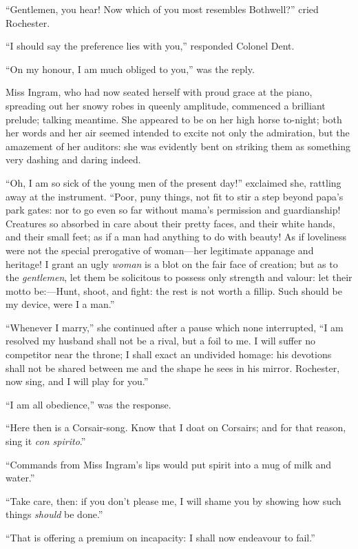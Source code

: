 \enquote{Gentlemen, you hear! Now which of you most resembles
Bothwell?} cried \Mr{} Rochester.

\enquote{I should say the preference lies with you,} responded Colonel
Dent.

\enquote{On my honour, I am much obliged to you,} was the reply.

Miss Ingram, who had now seated herself with proud grace at the piano,
spreading out her snowy robes in queenly amplitude, commenced a
brilliant prelude; talking meantime. She appeared to be on her high
horse to-night; both her words and her air seemed intended to excite not
only the admiration, but the amazement of her auditors: she was
evidently bent on striking them as something very dashing and daring
indeed.

\enquote{Oh, I am so sick of the young men of the present day!}
exclaimed she, rattling away at the instrument. \enquote{Poor, puny things,
not fit to stir a step beyond papa's park gates: nor to go even so far
without mama's permission and guardianship! Creatures so absorbed in
care about their pretty faces, and their white hands, and their small
feet; as if a man had anything to do with beauty! As if loveliness were
not the special prerogative of woman---her legitimate appanage and
heritage! I grant an ugly \emph{woman} is a blot on the fair face of
creation; but as to the \emph{gentlemen}, let them be solicitous to
possess only strength and valour: let their motto be:---Hunt, shoot, and
fight: the rest is not worth a fillip. Such should be my device, were I
a man.}

\enquote{Whenever I marry,} she continued after a pause which none
interrupted, \enquote{I am resolved my husband shall not be a rival, but
a foil to me. I will suffer no competitor near the throne; I shall
exact an undivided homage: his devotions shall not be shared between me
and the shape he sees in his mirror. \Mr{} Rochester, now sing, and I
will play for you.}

\enquote{I am all obedience,} was the response.

\enquote{Here then is a Corsair-song. Know that I doat on Corsairs; and for
that reason, sing it \emph{con spirito}.}

\enquote{Commands from Miss Ingram's lips would put spirit into a mug of
milk and water.}

\enquote{Take care, then: if you don't please me, I will shame you by showing
how such things \emph{should} be done.}

\enquote{That is offering a premium on incapacity: I shall now endeavour
to fail.}

